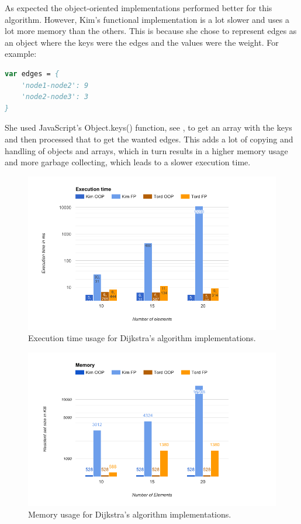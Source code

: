 \documentclass {article}
\begin{document}
As expected the object-oriented implementations performed better for this algorithm. However, Kim's functional implementation is a lot slower and uses a lot more memory than the others. This is because she chose to represent edges as an object where the keys were the edges and the values were the weight. For example:
 
\begin{lstlisting}[language=Pascal]
var edges = {
	'node1-node2': 9
	'node2-node3': 3
}
\end{lstlisting}
 
She used JavaScript's Object.keys() function, see \cite{jsref}, to get an array with the keys and then processed that to get the wanted edges. This adds a lot of copying and handling of objects and arrays, which in turn results in a higher memory usage and more garbage collecting, which leads to a slower execution time.
 
\begin{figure}[H]
\centering
\includegraphics[width=\textwidth]{dijkstras-runtime}

\caption{Execution time usage for Dijkstra's algorithm implementations.}
\label{fig:dijkstras-runtime}
\end{figure}
 
\begin{figure}[H]
\centering
\includegraphics[width=\textwidth]{dijkstras-memory}

\caption{Memory usage for Dijkstra's algorithm implementations.}
\label{fig:dijkstras-memory}
\end{figure}
\newpage
 
\end{document}
